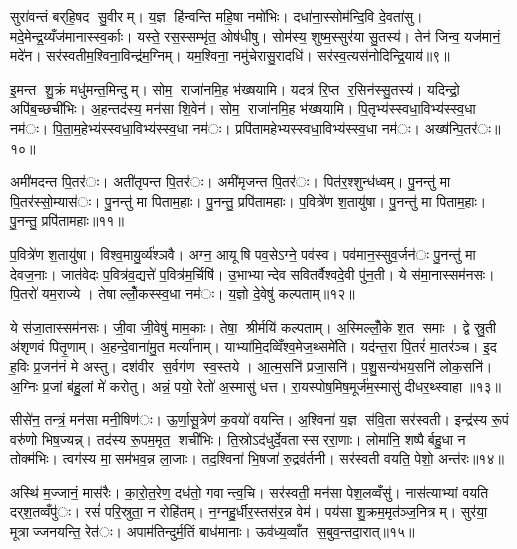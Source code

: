 
सुरा॑वन्तं बर्‌हि॒षद सु॒वीरम्। य॒ज्ञ हि॑न्वन्ति महि॒षा नमो॑भिः। दधा॑ना॒स्सोम॑न्दि॒वि दे॒वता॑सु। मदे॒मेन्द्र॒य्यँज॑मानास्स्व॒र्काः। यस्ते॒ रस॒स्सम्भृ॑त॒ ओष॑धीषु। सोम॑स्य॒ शुष्म॒स्सुर॑या सु॒तस्य॑। तेन॑ जिन्व॒ यज॑मानं॒ मदे॑न। सर॑स्वतीम॒श्विना॒विन्द्र॑म॒ग्निम्। यम॒श्विना॒ नमु॑चेरासु॒रादधि॑। सर॑स्व॒त्यस॑नोदिन्द्रि॒याय॑॥९॥

इ॒मन्त शु॒क्रं मधु॑मन्त॒मिन्दुम्। सोम॒ राजा॑नमि॒ह भ॑ख्षयामि। यदत्र॑ रि॒प्त र॒सिन॑स्सु॒तस्य॑। यदिन्द्रो॒ अपि॑ब॒च्छची॑भिः। अ॒हन्तद॑स्य॒ मन॑सा शि॒वेन॑। सोम॒ राजा॑नमि॒ह भ॑ख्षयामि। पि॒तृभ्य॑स्स्वधा॒विभ्य॑स्स्व॒धा नम॑ः। पि॒ता॒म॒हेभ्य॑स्स्वधा॒विभ्य॑स्स्व॒धा नम॑ः। प्रपि॑तामहेभ्यस्स्वधा॒विभ्य॑स्स्व॒धा नम॑ः। अख्ष॑न्पि॒तर॑ः॥१०॥

अमी॑मदन्त पि॒तर॑ः। अती॑तृपन्त पि॒तर॑ः। अमी॑मृजन्त पि॒तर॑ः। पित॑र॒श्शुन्ध॑ध्वम्। पु॒नन्तु॑ मा पि॒तर॑स्सो॒म्यास॑ः। पु॒नन्तु॑ मा पिताम॒हाः। पु॒नन्तु॒ प्रपि॑तामहाः। प॒वित्रे॑ण श॒तायु॑षा। पु॒नन्तु॑ मा पिताम॒हाः। पु॒नन्तु॒ प्रपि॑तामहाः॥११॥

प॒वित्रे॑ण श॒तायु॑षा। विश्व॒मायु॒र्व्य॑श्ञवै। अग्न॒ आयूषि पव॒सेऽग्ने॒ पव॑स्व। पव॑मान॒स्सुव॒र्जन॑ः पु॒नन्तु॑ मा देवज॒नाः। जात॑वेदः प॒वित्र॑व॒द्यत्ते॑ प॒वित्र॑म॒र्चिषि॑। उ॒भाभ्यान्देव सवितर्वैश्वदे॒वी पु॑न॒ती। ये स॑मा॒नास्सम॑नसः। पि॒तरो॑ यम॒राज्ये। तेषाल्लोँ॒कस्स्व॒धा नम॑ः। य॒ज्ञो दे॒वेषु॑ कल्पताम्॥१२॥

ये स॑जा॒तास्सम॑नसः। जी॒वा जी॒वेषु॑ माम॒काः। तेषा॒ श्रीर्मयि॑ कल्पताम्। अ॒स्मिल्लोँ॒के श॒त समाः। द्वे स्रु॒ती अ॑शृणवं पितृ॒णाम्। अ॒हन्दे॒वाना॑मु॒त मर्त्या॑नाम्। याभ्या॑मि॒दव्विँश्व॒मेज॒थ्समे॑ति। यद॑न्त॒रा पि॒तरं॑ मा॒तर॑ञ्च। इ॒द ह॒विः प्र॒जन॑नं मे अस्तु। दश॑वीर स॒र्वग॑ण स्व॒स्तये। आ॒त्म॒सनि॑ प्रजा॒सनि॑। प॒शु॒सन्य॑भय॒सनि॑ लोक॒सनि॑। अ॒ग्निः प्र॒जां ब॑हु॒लां मे॑ करोतु। अन्नं॒ पयो॒ रेतो॑ अ॒स्मासु॑ धत्त। रा॒यस्पोष॒मिष॒मूर्ज॑म॒स्मासु॑ दीधर॒थ्स्वाहा॥१३॥


सीसे॑न॒ तन्त्रं॒ मन॑सा मनी॒षिण॑ः। ऊ॒र्णा॒सू॒त्रेण॑ क॒वयो॑ वयन्ति। अ॒श्विना॑ य॒ज्ञ स॑वि॒ता सर॑स्वती। इन्द्र॑स्य रू॒पं वरु॑णो भिष॒ज्यन्न्। तद॑स्य रू॒पम॒मृत॒ शची॑भिः। ति॒स्रोऽद॑धुर्दे॒वतास्सररा॒णाः। लोमा॑नि॒ शष्पैर्बहु॒धा न तोक्म॑भिः। त्वग॑स्य मा॒सम॑भव॒न्न ला॒जाः। तद॒श्विना॑ भि॒षजा॑ रु॒द्रव॑र्तनी। सर॑स्वती वयति॒ पेशो॒ अन्त॑रः॥१४॥

अस्थि॑ म॒ज्जानं॒ मास॑रैः। का॒रो॒त॒रेण॒ दध॑तो॒ गवान्त्व॒चि। सर॑स्वती॒ मन॑सा पेश॒लव्वँसु॑। नास॑त्याभ्यां वयति दर्‌श॒तव्वँपु॑ः। रसं॑ परि॒स्रुता॒ न रोहि॑तम्। न॒ग्नहु॒र्धीर॒स्तस॑र॒न्न वेम॑। पय॑सा शु॒क्रम॒मृत॑ञ्ज॒नित्रम्। सुर॑या॒ मूत्राज्जनयन्ति॒ रेत॑ः। अपाम॑तिन्दुर्म॒तिं बाध॑मानाः। ऊव॑ध्य॒व्वाँत स॒बुव॒न्तदा॒रात्॥१५॥


